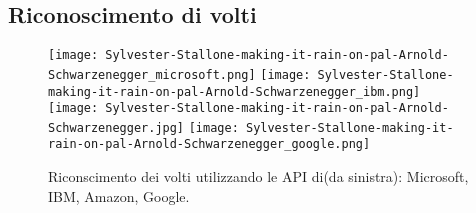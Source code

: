 \subsection{Riconoscimento di volti}\label{subsec:riconscimento-volti}
%
\begin{figure}[!h]
\begin{center}
	\texttt{[image: Sylvester-Stallone-making-it-rain-on-pal-Arnold-Schwarzenegger\_microsoft.png]}
	\texttt{[image: Sylvester-Stallone-making-it-rain-on-pal-Arnold-Schwarzenegger\_ibm.png]}
	\texttt{[image: Sylvester-Stallone-making-it-rain-on-pal-Arnold-Schwarzenegger.jpg]}
	\texttt{[image: Sylvester-Stallone-making-it-rain-on-pal-Arnold-Schwarzenegger\_google.png]}
{\scriptsize \caption{Riconscimento dei volti utilizzando le API di(da sinistra): Microsoft, IBM, Amazon, Google.}
\label{fig:riconscimento-volti}}
\end{center}
\end{figure}
